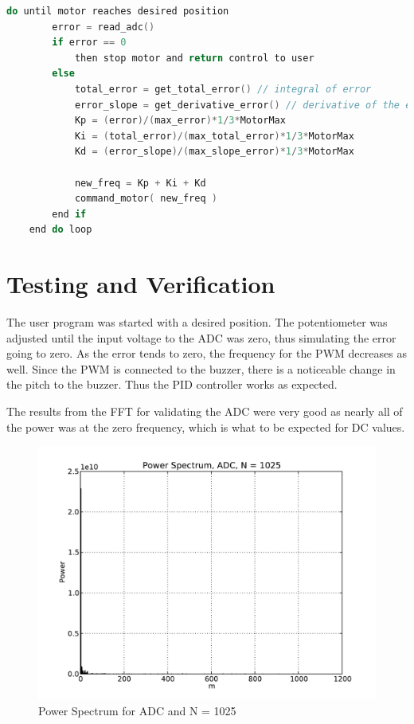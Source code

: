 \documentclass[10pt,conference]{IEEEtran}
\begin{document}
\begin{lstlisting}[language=C, frame=single, caption=Pseudo Code for PID Controller,label=L:PIDCode]
	do until motor reaches desired position
		error = read_adc()
		if error == 0
			then stop motor and return control to user
		else
			total_error = get_total_error() // integral of error
			error_slope = get_derivative_error() // derivative of the error
			Kp = (error)/(max_error)*1/3*MotorMax
			Ki = (total_error)/(max_total_error)*1/3*MotorMax
			Kd = (error_slope)/(max_slope_error)*1/3*MotorMax

			new_freq = Kp + Ki + Kd
			command_motor( new_freq )
		end if
	end do loop
\end{lstlisting}

%
%
\section{Testing and Verification}
The user program was started with a desired position. The potentiometer was adjusted until the input voltage to the ADC was zero, thus simulating the error going to zero. As the error tends to zero, the frequency for the PWM decreases as well. Since the PWM is connected to the buzzer, there is a noticeable change in the pitch to the buzzer. Thus the PID controller works as expected.

The results from the FFT for validating the ADC were very good as nearly all of the power was at the zero frequency, which is what to be expected for DC values.
\begin{figure}[ht]
	\includegraphics[scale=.50]{power_spectrum_adc_1025}
	\caption{Power Spectrum for ADC and N = 1025}\label{F:power_spectrum_adc_1025}
\end{figure}
\end{document}

